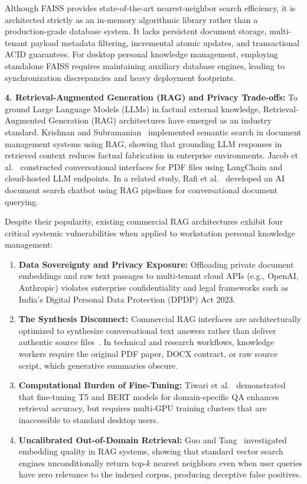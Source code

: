 \documentclass[a4paper,12pt]{article}
\begin{document}
Although FAISS provides state-of-the-art nearest-neighbor search efficiency, it is architected strictly as an in-memory algorithmic library rather than a production-grade database system. It lacks persistent document storage, multi-tenant payload metadata filtering, incremental atomic updates, and transactional ACID guarantees. For desktop personal knowledge management, employing standalone FAISS requires maintaining auxiliary database engines, leading to synchronization discrepancies and heavy deployment footprints.

\vspace{0.8em}
\noindent\textbf{4. Retrieval-Augmented Generation (RAG) and Privacy Trade-offs:}
To ground Large Language Models (LLMs) in factual external knowledge, Retrieval-Augmented Generation (RAG) architectures have emerged as an industry standard. Krishnan and Subramanian~\cite{krishnan2025semantic} implemented semantic search in document management systems using RAG, showing that grounding LLM responses in retrieved context reduces factual fabrication in enterprise environments. Jacob et al.~\cite{jacob2024chatgpt} constructed conversational interfaces for PDF files using LangChain and cloud-hosted LLM endpoints. In a related study, Rafi et al.~\cite{rafi2026rag} developed an AI document search chatbot using RAG pipelines for conversational document querying.

Despite their popularity, existing commercial RAG architectures exhibit four critical systemic vulnerabilities when applied to workstation personal knowledge management:
\begin{enumerate}
    \item \textbf{Data Sovereignty and Privacy Exposure:} Offloading private document embeddings and raw text passages to multi-tenant cloud APIs (e.g., OpenAI, Anthropic) violates enterprise confidentiality and legal frameworks such as India's Digital Personal Data Protection (DPDP) Act 2023.
    \item \textbf{The Synthesis Disconnect:} Commercial RAG interfaces are architecturally optimized to synthesize conversational text answers rather than deliver authentic source files~\cite{saha2024quim}. In technical and research workflows, knowledge workers require the original PDF paper, DOCX contract, or raw source script, which generative summaries obscure.
    \item \textbf{Computational Burden of Fine-Tuning:} Tiwari et al.~\cite{tiwari2026finetuning} demonstrated that fine-tuning T5 and BERT models for domain-specific QA enhances retrieval accuracy, but requires multi-GPU training clusters that are inaccessible to standard desktop users.
    \item \textbf{Uncalibrated Out-of-Domain Retrieval:} Guo and Tang~\cite{cejas2025retrieval} investigated embedding quality in RAG systems, showing that standard vector search engines unconditionally return top-$k$ nearest neighbors even when user queries have zero relevance to the indexed corpus, producing deceptive false positives.
\end{enumerate}
\end{document}
